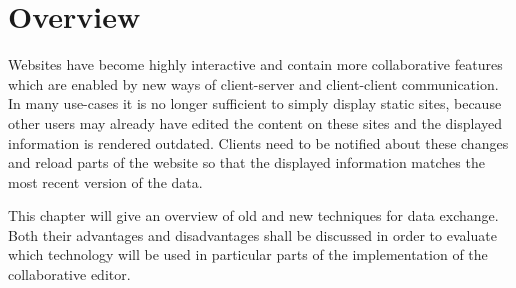 \section{Overview}

Websites have become highly interactive and contain more collaborative features which are enabled by new ways of client-server and client-client communication. In many use-cases it is no longer sufficient to simply display static sites, because other users may already have edited the content on these sites and the displayed information is rendered outdated. Clients need to be notified about these changes and reload parts of the website so that the displayed information matches the most recent version of the data.

This chapter will give an overview of old and new techniques for data exchange. Both their advantages and disadvantages shall be discussed in order to evaluate which technology will be used in particular parts of the implementation of the collaborative editor.